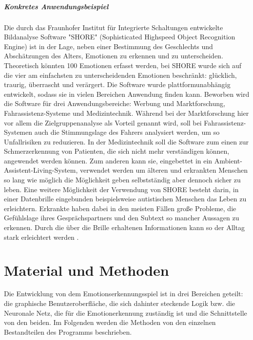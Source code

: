 \documentclass[12pt,a4paper,headinclude,twoside, plainheadsepline, open=right,numbers=noenddot]{scrreprt}
\begin{document}
\paragraph{Konkretes Anwendungsbeispiel}
Die durch das Fraunhofer Institut für Integrierte Schaltungen entwickelte Bildanalyse Software "{}SHORE"{}  (Sophisticated Highspeed Object Recognition Engine)  ist in der Lage, neben einer Bestimmung des Geschlechts und Abschätzungen des Alters, Emotionen zu erkennen und zu unterscheiden. Theoretisch könnten 100 Emotionen erfasst werden, bei SHORE wurde sich auf die vier am einfachsten zu unterscheidenden Emotionen beschränkt: glücklich, traurig, überrascht und verärgert. Die Software wurde plattformunabhängig entwickelt, sodass sie in vielen Bereichen Anwendung finden kann. Beworben wird die Software für drei Anwendungsbereiche: Werbung und Marktforschung, Fahrassistenz-Systeme und Medizintechnik. Während bei der Marktforschung hier vor allem die Zielgruppenanalyse als Vorteil genannt wird, soll bei Fahrassistenz-Systemen auch die Stimmungslage des Fahrers analysiert werden, um so Unfallrisiken zu reduzieren. In der Medizintechnik soll die Software zum einen zur Schmerzerkennung von Patienten, die sich nicht mehr verständigen können, angewendet werden können. Zum anderen kann sie, eingebettet in ein Ambient-Assistent-Living-System, verwendet werden um älteren und erkrankten Menschen so lang wie möglich die Möglichkeit geben selbstständig aber dennoch sicher zu leben.
Eine weitere Möglichkeit der Verwendung von SHORE besteht darin, in einer Datenbrille eingebunden beispielsweise autistischen Menschen das Leben zu erleichtern. Erkrankte haben dabei in den meisten Fällen große Probleme, die Gefühlslage ihres Gesprächspartners und den Subtext so mancher Aussagen zu erkennen. Durch die über die Brille erhaltenen Informationen kann so der Alltag stark erleichtert werden\cite{Ruf2011} \cite{SHORE}. 

\chapter{Material und Methoden}
Die Entwicklung von dem Emotionserkennungsspiel ist in drei Bereichen geteilt:
die graphische Benutzeroberfläche, die sich dahinter steckende Logik bzw. die
Neuronale Netz, die für die Emotionerkennung zuständig ist und die Schnittstelle
von den beiden. Im Folgenden werden die Methoden von den einzelnen Bestandteilen
des Programms beschrieben. 
\end{document}
